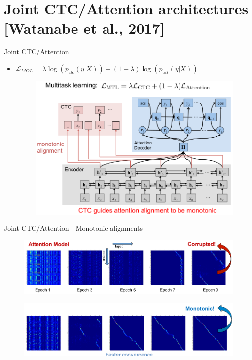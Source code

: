 \documentclass[10pt]{beamer}
\begin{document}
\section{Joint CTC/Attention architectures [Watanabe et al., 2017]}
\begin{frame}[fragile]{Joint CTC/Attention}
\begin{itemize}
	\item $\mathcal{L}_{MOL} = \lambda \log\left(p_{ctc}(y|X)\right) + (1 - \lambda) \log\left(p_{att}(y|X)\right)$
	\begin{figure}
		\includegraphics[height=0.8\textheight]{./images/mtl4.png}
	\end{figure}
\end{itemize}
\end{frame}


\begin{frame}[fragile]{Joint CTC/Attention - Monotonic alignments}
\begin{figure}
	\includegraphics[width=\linewidth]{./images/mtl2.png}
\end{figure}

\begin{figure}
	\includegraphics[width=\linewidth]{./images/mtl3.png}
\end{figure}	

\end{frame}
\end{document}

